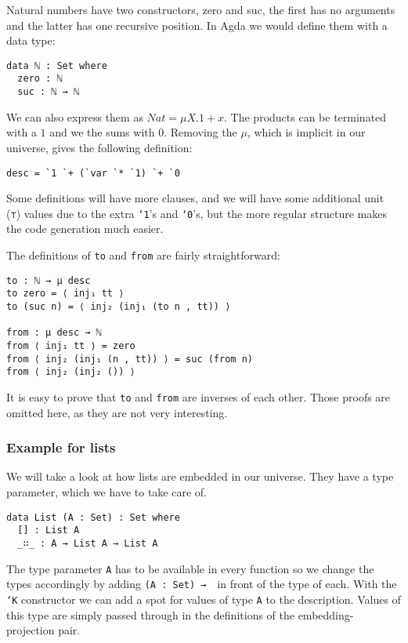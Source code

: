 Natural numbers have two constructors, zero and suc, the first has no
arguments and the latter has one recursive position.
In Agda we would define them with a data type:

\begin{verbatim}
data ℕ : Set where
  zero : ℕ
  suc : ℕ → ℕ
\end{verbatim}

We can also express them as $Nat = μX. 1 + x$.
The products can be terminated with a $1$ and we the sums with $0$.
Removing the $μ$, which is implicit in our universe, gives the
following definition:

\begin{verbatim}
desc = `1 `+ (`var `* `1) `+ `0
\end{verbatim}

Some definitions will have more clauses, and we will have some
additional unit (\texttt{⊤}) values due to the extra \texttt{`1}'s and
\texttt{`0}'s, but the more regular structure makes the code
generation much easier.

The definitions of \texttt{to} and \texttt{from} are fairly
straightforward:

\begin{verbatim}
to : ℕ → μ desc
to zero = ⟨ inj₁ tt ⟩
to (suc n) = ⟨ inj₂ (inj₁ (to n , tt)) ⟩

from : μ desc → ℕ
from ⟨ inj₁ tt ⟩ = zero
from ⟨ inj₂ (inj₁ (n , tt)) ⟩ = suc (from n)
from ⟨ inj₂ (inj₂ ()) ⟩
\end{verbatim}

It is easy to prove that \texttt{to} and \texttt{from} are inverses of
each other.
Those proofs are omitted here, as they are not very interesting.

\subsubsection[Example for lists]
  {Example for lists}

We will take a look at how lists are embedded in our universe.
They have a type parameter, which we have to take care of.

\begin{verbatim}
data List (A : Set) : Set where
  [] : List A
  _∷_ : A → List A → List A
\end{verbatim}

The type parameter \texttt{A} has to be available in every function so we change
the types accordingly by adding \texttt{(A : Set) →}\ \ in front of the
type of each.
With the \texttt{`K} constructor we can add a spot for values of type \texttt{A} to
the description.
Values of this type are simply passed through in the definitions of
the embedding-projection pair.

